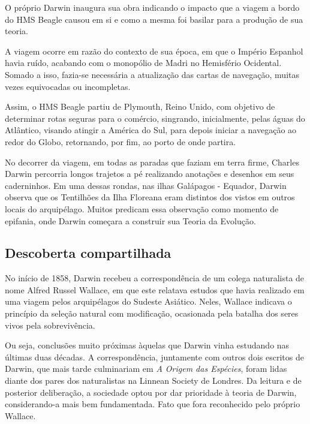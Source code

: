 \documentclass[11pt]{extarticle}
\begin{document}
O próprio Darwin inaugura sua obra indicando o impacto que a viagem a bordo do
HMS Beagle causou em si e como a mesma foi basilar para a produção de sua
teoria.




A viagem ocorre em razão do contexto de sua época, em que o Império Espanhol
havia ruído, acabando com o monopólio de Madri no Hemisfério Ocidental. Somado
a isso, fazia-se necessária a atualização das cartas de navegação, muitas vezes
equivocadas ou incompletas.

Assim, o HMS Beagle partiu de Plymouth, Reino Unido, com objetivo de determinar
rotas seguras para o comércio, singrando, inicialmente, pelas águas do
Atlântico, visando atingir a América do Sul, para depois iniciar a navegação ao
redor do Globo, retornando, por fim, ao porto de onde partira.




No decorrer da viagem, em todas as paradas que faziam em terra firme, Charles
Darwin percorria longos trajetos a pé realizando anotações e desenhos em seus
caderninhos. Em uma dessas rondas, nas ilhas Galápagos - Equador, Darwin
observa que os Tentilhões da Ilha Floreana eram distintos dos vistos em outros
locais do arquipélago. Muitos predicam essa observação como momento de
epifania, onde Darwin começara a construir sua Teoria da Evolução.

\subsection{Descoberta compartilhada}

No início de 1858, Darwin recebeu a correspondência de um colega naturalista de
nome Alfred Russel Wallace, em que este relatava estudos que havia realizado em
uma viagem pelos arquipélagos do Sudeste Asiático. Neles, Wallace indicava
o princípio da seleção natural com modificação, ocasionada pela batalha dos
seres vivos pela sobrevivência.

Ou seja, conclusões muito próximas àquelas que Darwin vinha estudando nas
últimas duas décadas. A correspondência, juntamente com outros dois escritos de
Darwin, que mais tarde culminariam em \emph{A Origem das Espécies}, foram lidas
diante dos pares dos naturalistas na Linnean Society de Londres. Da leitura
e de posterior deliberação, a sociedade optou por dar prioridade à teoria de
Darwin, considerando-a mais bem fundamentada. Fato que fora reconhecido pelo
próprio Wallace.
\end{document}
